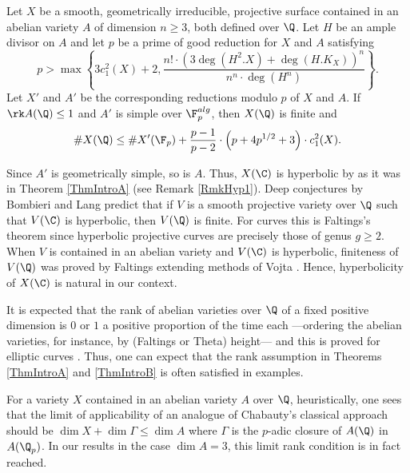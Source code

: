 \begin{theorem}
\notready\label{ThmIntroB} Let $X$ be a smooth, geometrically irreducible, projective surface contained in an abelian variety $A$ of dimension $n\ge 3$, both defined over $\Q$.  Let $H$ be an ample divisor on $A$ and let $p$ be a prime of good reduction for $X$ and $A$ satisfying
$$
p> \max\left\{3 c_1^2(X)+2,\frac{n!\cdot (3\deg(H^{2}.X) + \deg(H.K_X))^n}{n^n\cdot \deg(H^n)}\right\}.
$$
Let $X'$ and $A'$ be the corresponding reductions modulo $p$ of $X$ and $A$.  If $\rk A(\Q)\le 1$ and $A'$ is simple over $\F_p^{alg}$, then $X(\Q)$ is finite and
$$
\#X(\Q) \le \# X'(\F_p) + \frac{p-1}{p-2}\cdot \left(p+4p^{1/2} + 3\right)\cdot c_1^2(X).
$$
\end{theorem}

\begin{remark}
\notready Since $A'$ is geometrically simple, so is $A$. Thus, $X(\C)$ is hyperbolic  by \cite{Green} as it was in Theorem \ref{ThmIntroA} (see Remark \ref{RmkHyp1}). Deep conjectures by Bombieri and Lang predict that if $V$ is a smooth projective variety over $\Q$ such that $V(\C)$ is hyperbolic, then $V(\Q)$ is finite. For curves this is Faltings's theorem since hyperbolic projective curves are precisely those of genus $g\ge 2$. When $V$ is contained in an abelian variety and $V(\C)$ is hyperbolic, finiteness of $V(\Q)$ was proved by Faltings \cite{Faltings2} extending methods of Vojta \cite{VojtaCompact}.  Hence, hyperbolicity of $X(\C)$ is natural in our context.
\end{remark}

\begin{remark}
\notready\label{RmkRk} It is expected that the rank of abelian varieties over $\Q$ of a fixed positive dimension is $0$ or $1$ a positive proportion of the time each ---ordering the abelian varieties, for instance, by (Faltings or Theta) height--- and this is proved for elliptic curves \cite{BhargavaShankar,BhargavaSkinner}. Thus, one can expect that the rank assumption in Theorems \ref{ThmIntroA} and \ref{ThmIntroB} is often satisfied in examples.
\end{remark}

\begin{remark}
\notready For a variety $X$  contained in an abelian variety $A$ over $\Q$, heuristically, one sees that the limit of applicability of an analogue of Chabauty's classical approach should be $\dim X+ \dim \Gamma \le \dim A$ where $\Gamma$ is the $p$-adic closure of $A(\Q)$ in $A(\Q_p)$. In our results in the case $\dim A=3$, this limit rank condition is in fact reached.
\end{remark}

